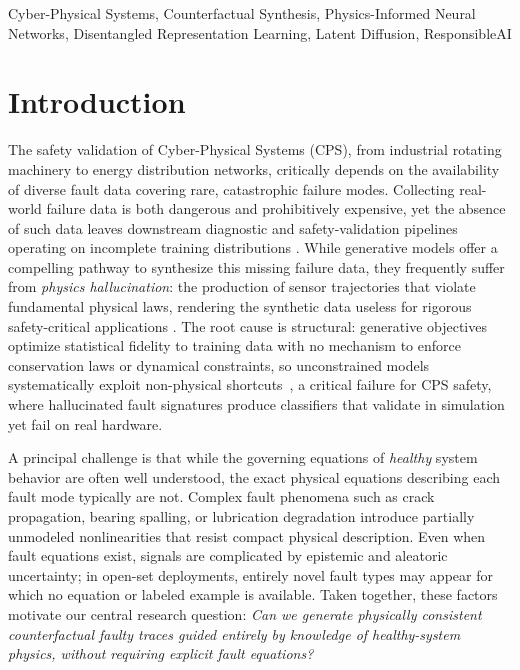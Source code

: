 \documentclass[conference]{IEEEtran}
\begin{document}
\begin{IEEEkeywords}
Cyber-Physical Systems, Counterfactual Synthesis, Physics-Informed Neural Networks, Disentangled Representation Learning, Latent Diffusion, ResponsibleAI
\end{IEEEkeywords}

\section{Introduction}
\label{sec:intro}

The safety validation of Cyber-Physical Systems (CPS), from industrial rotating machinery to energy distribution networks, critically depends on the availability of diverse fault data covering rare, catastrophic failure modes. Collecting real-world failure data is both dangerous and prohibitively expensive, yet the absence of such data leaves downstream diagnostic and safety-validation pipelines operating on incomplete training distributions \cite{lei2020applications, spotorno2026linking}. While generative models offer a compelling pathway to synthesize this missing failure data, they frequently suffer from \emph{physics hallucination}: the production of sensor trajectories that violate fundamental physical laws, rendering the synthetic data useless for rigorous safety-critical applications \cite{karniadakis2021physics}. The root cause is structural: generative objectives optimize statistical fidelity to training data with no mechanism to enforce conservation laws or dynamical constraints, so unconstrained models systematically exploit non-physical shortcuts~\cite{bastek2025}, a critical failure for CPS safety, where hallucinated fault signatures produce classifiers that validate in simulation yet fail on real hardware.

A principal challenge is that while the governing equations of \emph{healthy} system behavior are often well understood, the exact physical equations describing each fault mode typically are not. Complex fault phenomena such as crack propagation, bearing spalling, or lubrication degradation introduce partially unmodeled nonlinearities that resist compact physical description. Even when fault equations exist, signals are complicated by epistemic and aleatoric uncertainty; in open-set deployments, entirely novel fault types may appear for which no equation or labeled example is available. Taken together, these factors motivate our central research question: \emph{Can we generate physically consistent counterfactual faulty traces guided entirely by knowledge of healthy-system physics, without requiring explicit fault equations?}
\end{document}
